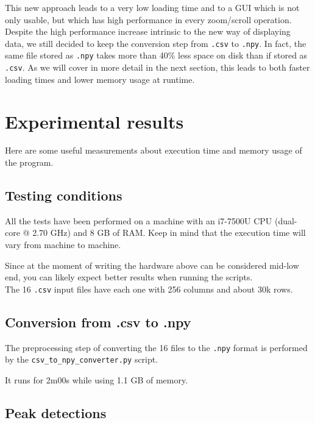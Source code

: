 \documentclass[11pt,a4paper]{article}
\begin{document}
This new approach leads to a very low loading time and to a GUI which is not only usable, but which has high performance in every zoom/scroll operation.\\

Despite the high performance increase intrinsic to the new way of displaying data, we still decided to keep the conversion step from \texttt{.csv} to \texttt{.npy}.
In fact, the same file stored as \texttt{.npy} takes more than 40\% less space on disk than if stored as \texttt{.csv}.
As we will cover in more detail in the next section, this leads to both faster loading times and lower memory usage at runtime.

\section{Experimental results}
\label{sec:experimental-results}

Here are some useful measurements about execution time and memory usage of the program.

\subsection{Testing conditions}

All the tests have been performed on a machine with an i7-7500U CPU (dual-core @ 2.70 GHz) and 8 GB of RAM.
Keep in mind that the execution time will vary from machine to machine.

Since at the moment of writing the hardware above can be considered mid-low end, you can likely expect better results when running the scripts.\\

The 16 \texttt{.csv} input files have each one with 256 columns and about 30k rows.

\subsection{Conversion from .csv to .npy}

The preprocessing step of converting the 16 files to the \texttt{.npy} format is performed by the \texttt{csv\_to\_npy\_converter.py} script.

It runs for 2m00s while using 1.1 GB of memory.

\subsection{Peak detections}
\end{document}
